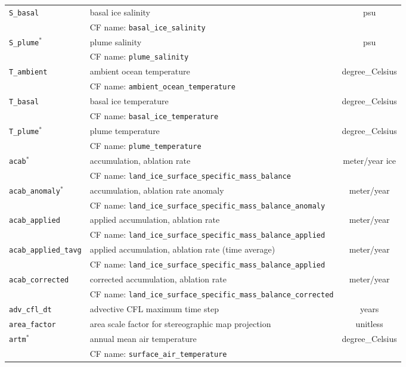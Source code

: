 \begin{center}
\begin{supertabular}{|l|p{8cm}|c|}
\hline
\texttt{S\_basal} & basal ice salinity & psu\\
&CF name: \texttt{basal\_ice\_salinity}&\\
\hline
\texttt{S\_plume}$^\ast$ & plume salinity & psu\\
&CF name: \texttt{plume\_salinity}&\\
\hline
\texttt{T\_ambient} & ambient ocean temperature & degree\_Celsius\\
&CF name: \texttt{ambient\_ocean\_temperature}&\\
\hline
\texttt{T\_basal} & basal ice temperature & degree\_Celsius\\
&CF name: \texttt{basal\_ice\_temperature}&\\
\hline
\texttt{T\_plume}$^\ast$ & plume temperature & degree\_Celsius\\
&CF name: \texttt{plume\_temperature}&\\
\hline
\texttt{acab}$^\ast$ & accumulation, ablation rate & meter/year ice\\
&CF name: \texttt{land\_ice\_surface\_specific\_mass\_balance}&\\
\hline
\texttt{acab\_anomaly}$^\ast$ & accumulation, ablation rate anomaly & meter/year\\
&CF name: \texttt{land\_ice\_surface\_specific\_mass\_balance\_anomaly}&\\
\hline
\texttt{acab\_applied} & applied accumulation, ablation rate & meter/year\\
&CF name: \texttt{land\_ice\_surface\_specific\_mass\_balance\_applied}&\\
\hline
\texttt{acab\_applied\_tavg} & applied accumulation, ablation rate (time average) & meter/year\\
&CF name: \texttt{land\_ice\_surface\_specific\_mass\_balance\_applied}&\\
\hline
\texttt{acab\_corrected} & corrected accumulation, ablation rate & meter/year\\
&CF name: \texttt{land\_ice\_surface\_specific\_mass\_balance\_corrected}&\\
\hline
\texttt{adv\_cfl\_dt} & advective CFL maximum time step & years\\
\hline
\texttt{area\_factor} & area scale factor for stereographic map projection & unitless\\
\hline
\texttt{artm}$^\ast$ & annual mean air temperature & degree\_Celsius\\
&CF name: \texttt{surface\_air\_temperature}&\\

\end{supertabular}
\end{center}
